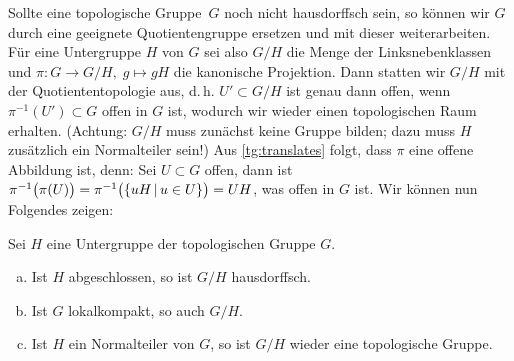 Sollte eine topologische Gruppe~$G$ noch nicht hausdorffsch sein, so können wir
$G$ durch eine geeignete Quotientengruppe ersetzen und mit dieser
weiterarbeiten. Für eine Untergruppe $H$ von $G$ sei also $G/H$ die Menge der
Linksnebenklassen und $\pi\colon G \to G/H,\; g\mapsto gH$ die kanonische
Projektion. Dann statten wir $G/H$ mit der Quotiententopologie aus, d.\,h.
$U'\subset G/H$ ist genau dann offen, wenn $\pi^{-1}(U') \subset G$ offen in $G$
ist, wodurch wir wieder einen topologischen Raum erhalten. (Achtung: $G/H$
muss zunächst keine Gruppe bilden; dazu muss $H$ zusätzlich ein Normalteiler
sein!) Aus \cref{tg:translates} folgt, dass $\pi$ eine offene Abbildung ist,
denn: Sei $U \subset G$ offen, dann ist $\pi^{-1}\bigl( \pi(U) \bigr)
= \pi^{-1}\bigl( \{ uH \Mid u\in U \} \bigr) = UH$, was offen in $G$ ist.
Wir können nun Folgendes zeigen:
%
\begin{thLemma}
    \label{tg:quot}
    Sei $H$ eine Untergruppe der topologischen Gruppe $G$.
    \begin{enumerate}[a)]
        \item\label{tg:quot:hausdorff}
            Ist $H$ abgeschlossen, so ist $G/H$ hausdorffsch.
        \item\label{tg:quot:lcompact}
            Ist $G$ lokalkompakt, so auch $G/H$.
        \item\label{tg:quot:topogrp}
            Ist $H$ ein Normalteiler von $G$, so ist $G/H$ wieder eine
            topologische Gruppe.
    \end{enumerate}
\end{thLemma}

